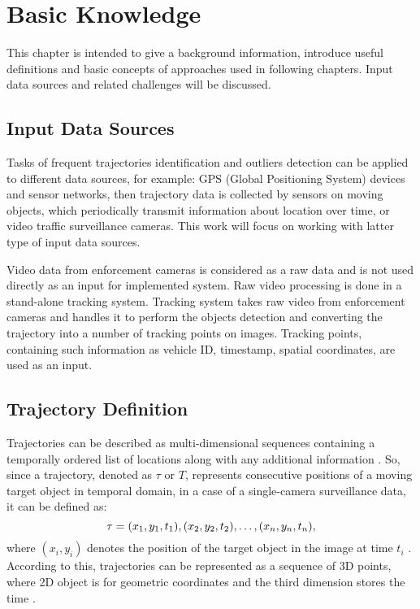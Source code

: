\chapter{Basic Knowledge}
\label{ch:Basic Knowledge}

This chapter is intended to give a background information, introduce useful definitions and basic concepts of approaches used in following chapters. Input data sources and related challenges will be discussed.

\section{Input Data Sources}
Tasks of frequent trajectories identification and outliers detection can be applied to different data sources, for example: GPS (Global Positioning System) devices and sensor networks, then trajectory data is collected by sensors on moving objects, which periodically transmit information about location over time, or video traffic surveillance cameras. This work will focus on working with latter type of input data sources.

Video data from enforcement cameras is considered as a raw data and is not used directly as an input for implemented system. Raw video processing is done in a stand-alone tracking system. Tracking system takes raw video from enforcement cameras and handles it to perform the objects detection and converting the trajectory into a number of tracking points on images. Tracking points, containing such information as vehicle ID, timestamp, spatial coordinates, are used as an input.

\section{Trajectory Definition}

Trajectories can be described as multi-dimensional sequences containing a temporally ordered list of locations along with any additional information \cite{article:1_survey_stdm}. So, since a trajectory, denoted as $\tau$ or $T$, represents consecutive positions of a moving target object in temporal domain, in a case of a single-camera surveillance data, it can be defined as:
\begin{equation}
	\tau = {(x_1, y_1, t_1), (x_2, y_2, t_2), \ldots, (x_n, y_n, t_n)}\\[3pt],
\end{equation}
where $(x_i, y_i)$ denotes the position of the target object in the image at time $t_i$ \cite{article:5_survey_tbsa}. According to this, trajectories can be represented as a sequence of 3D points, where 2D object is for geometric coordinates and the third dimension stores the time \cite{article:25_dhr_mvt_eesd}.

